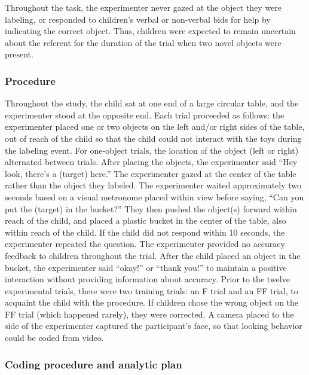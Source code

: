\documentclass[english,man]{apa6}
\theoremstyle{definition}
\theoremstyle{definition}
\theoremstyle{definition}
\theoremstyle{remark}
\begin{document}
Throughout the task, the experimenter never gazed at the object they
were labeling, or responded to children's verbal or non-verbal bids for
help by indicating the correct object. Thus, children were expected to
remain uncertain about the referent for the duration of the trial when
two novel objects were present.

\subsubsection{Procedure}\label{procedure}

Throughout the study, the child sat at one end of a large circular
table, and the experimenter stood at the opposite end. Each trial
proceeded as follows: the experimenter placed one or two objects on the
left and/or right sides of the table, out of reach of the child so that
the child could not interact with the toys during the labeling event.
For one-object trials, the location of the object (left or right)
alternated between trials. After placing the objects, the experimenter
said \enquote{Hey look, there's a (target) here.} The experimenter gazed
at the center of the table rather than the object they labeled. The
experimenter waited approximately two seconds based on a visual
metronome placed within view before saying, \enquote{Can you put the
(target) in the bucket?} They then pushed the object(s) forward within
reach of the child, and placed a plastic bucket in the center of the
table, also within reach of the child. If the child did not respond
within 10 seconds, the experimenter repeated the question. The
experimenter provided no accuracy feedback to children throughout the
trial. After the child placed an object in the bucket, the experimenter
said \enquote{okay!} or \enquote{thank you!} to maintain a positive
interaction without providing information about accuracy. Prior to the
twelve experimental trials, there were two training trials: an F trial
and an FF trial, to acquaint the child with the procedure. If children
chose the wrong object on the FF trial (which happened rarely), they
were corrected. A camera placed to the side of the experimenter captured
the participant's face, so that looking behavior could be coded from
video.

\subsubsection{Coding procedure and analytic
plan}\label{coding-procedure-and-analytic-plan}
\end{document}
